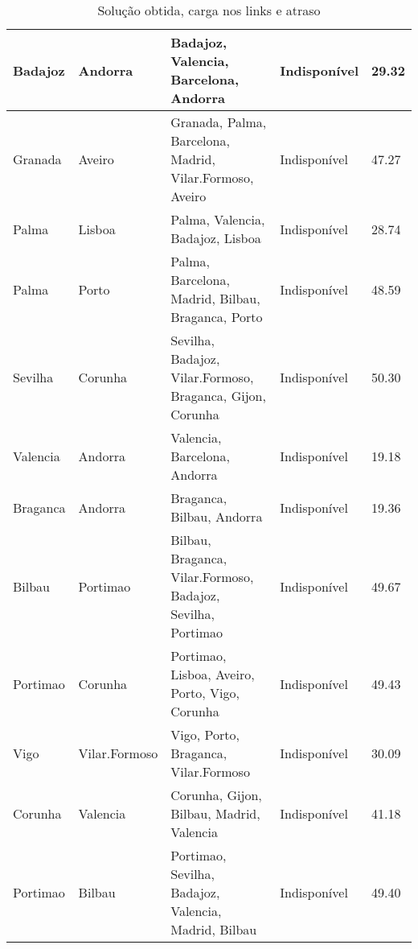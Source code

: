\begin{table}[!htb]
{\begin{tabular}{|l|l|l|l|l|}
Badajoz & Andorra & Badajoz, Valencia, Barcelona, Andorra & Indisponível & 29.32 \\ \hline
Granada & Aveiro & Granada, Palma, Barcelona, Madrid, Vilar.Formoso, Aveiro & Indisponível & 47.27 \\ \hline
Palma & Lisboa & Palma, Valencia, Badajoz, Lisboa & Indisponível & 28.74 \\ \hline
Palma & Porto & Palma, Barcelona, Madrid, Bilbau, Braganca, Porto & Indisponível & 48.59 \\ \hline
Sevilha & Corunha & Sevilha, Badajoz, Vilar.Formoso, Braganca, Gijon, Corunha & Indisponível & 50.30 \\ \hline
Valencia & Andorra & Valencia, Barcelona, Andorra & Indisponível & 19.18 \\ \hline
Braganca & Andorra & Braganca, Bilbau, Andorra & Indisponível & 19.36 \\ \hline
Bilbau & Portimao & Bilbau, Braganca, Vilar.Formoso, Badajoz, Sevilha, Portimao & Indisponível & 49.67 \\ \hline
Portimao & Corunha & Portimao, Lisboa, Aveiro, Porto, Vigo, Corunha & Indisponível & 49.43 \\ \hline
Vigo & Vilar.Formoso & Vigo, Porto, Braganca, Vilar.Formoso & Indisponível & 30.09 \\ \hline
Corunha & Valencia & Corunha, Gijon, Bilbau, Madrid, Valencia & Indisponível & 41.18 \\ \hline
Portimao & Bilbau & Portimao, Sevilha, Badajoz, Valencia, Madrid, Bilbau & Indisponível & 49.40 \\ \hline
\end{tabular}}
\caption[]{Solução obtida, carga nos links e atraso}
\end{table}

